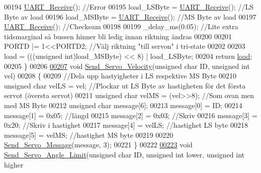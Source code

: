 \begin{DoxyCode}
00194     \hyperlink{servo___u_a_r_t_8c_ae61a7bb5a727a8605e5865fc36e4e26b}{UART\_Receive}(); \textcolor{comment}{//Error}
00195     load\_LSByte = \hyperlink{servo___u_a_r_t_8c_ae61a7bb5a727a8605e5865fc36e4e26b}{UART\_Receive}(); \textcolor{comment}{//LS Byte av load}
00196     load\_MSByte = \hyperlink{servo___u_a_r_t_8c_ae61a7bb5a727a8605e5865fc36e4e26b}{UART\_Receive}(); \textcolor{comment}{//MS Byte av load}
00197     \hyperlink{servo___u_a_r_t_8c_ae61a7bb5a727a8605e5865fc36e4e26b}{UART\_Receive}(); \textcolor{comment}{//Checksum}
00198     
00199     \_delay\_ms(0.05); \textcolor{comment}{//Lite extra tidsmarginal så bussen hinner bli ledig innan riktning ändras}
00200     
00201     PORTD |= 1<<PORTD2; \textcolor{comment}{//Välj riktning "till servon" i tri-state}
00202     
00203     load = (((\textcolor{keywordtype}{unsigned} int)load\_MSByte) << 8) | load\_LSByte;
00204     \textcolor{keywordflow}{return} \hyperlink{over__hinder_8c_a29122f6df4a054b8141015682f877c82}{load};
00205 \}
00206 
\hypertarget{servo___u_a_r_t_8c_source.tex_l00207}{}\hyperlink{servo___u_a_r_t_8h_ac325c1636bc0a1c5b6cbe967bca0a6d2}{00207} \textcolor{keywordtype}{void} \hyperlink{servo___u_a_r_t_8c_ac325c1636bc0a1c5b6cbe967bca0a6d2}{Send\_Servo\_Velocity}(\textcolor{keywordtype}{unsigned} \textcolor{keywordtype}{char} ID, \textcolor{keywordtype}{unsigned} \textcolor{keywordtype}{int} vel)
00208 \{
00209     \textcolor{comment}{//Dela upp hastyigheter i LS respektive MS Byte}
00210     \textcolor{keywordtype}{unsigned} \textcolor{keywordtype}{char} velLS = vel; \textcolor{comment}{//Plockar ut LS Byte av hastigheten för det första servot (översta servot)}
00211     \textcolor{keywordtype}{unsigned} \textcolor{keywordtype}{char} velMS = (vel>>8); \textcolor{comment}{//Som ovan men med MS Byte}
00212     \textcolor{keywordtype}{unsigned} \textcolor{keywordtype}{char} message[6];
00213     message[0] = ID;
00214     message[1] = 0x05;  \textcolor{comment}{//längd }
00215     message[2] = 0x03;  \textcolor{comment}{//Skriv }
00216     message[3] = 0x20;  \textcolor{comment}{//Skriv i hastighet }
00217     message[4] = velLS; \textcolor{comment}{//hastighet LS byte}
00218     message[5] = velMS; \textcolor{comment}{//hastighet MS byte}
00219     
00220     \hyperlink{servo___u_a_r_t_8c_a2ed3a2903977a774d1b174665d50661c}{Send\_Servo\_Message}(message, 3);
00221 \}
00222 
\hypertarget{servo___u_a_r_t_8c_source.tex_l00223}{}\hyperlink{servo___u_a_r_t_8h_aae1b10368951b07e7049392da8e8160b}{00223} \textcolor{keywordtype}{void} \hyperlink{servo___u_a_r_t_8c_aae1b10368951b07e7049392da8e8160b}{Send\_Servo\_Angle\_Limit}(\textcolor{keywordtype}{unsigned} \textcolor{keywordtype}{char} ID, \textcolor{keywordtype}{unsigned} \textcolor{keywordtype}{int} lower, \textcolor{keywordtype}{unsigned} \textcolor{keywordtype}{int} higher

\end{DoxyCode}

